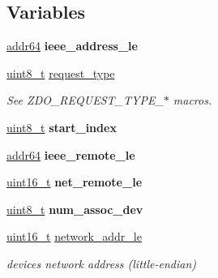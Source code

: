 \subsection*{Variables}
\begin{DoxyCompactItemize}
\item 
\mbox{\label{group__zdo_gaaa2474cd4ba581b23bc91a868c7e2714}} 
\hyperlink{unionaddr64}{addr64} {\bfseries ieee\+\_\+address\+\_\+le}
\item 
\mbox{\label{group__zdo_gacccc7895ee6181a7b3a1e15712402b55}} 
\hyperlink{group__hal__dos_gae1affc9ca37cfb624959c866a73f83c2}{uint8\+\_\+t} \hyperlink{group__zdo_gacccc7895ee6181a7b3a1e15712402b55}{request\+\_\+type}
\begin{DoxyCompactList}\small\item\em See Z\+D\+O\+\_\+\+R\+E\+Q\+U\+E\+S\+T\+\_\+\+T\+Y\+P\+E\+\_\+$\ast$ macros. \end{DoxyCompactList}\item 
\mbox{\label{group__zdo_ga00d5b2926389442973ad976082766309}} 
\hyperlink{group__hal__dos_gae1affc9ca37cfb624959c866a73f83c2}{uint8\+\_\+t} {\bfseries start\+\_\+index}
\item 
\mbox{\label{group__zdo_ga78a3358cbe5c23b718fba39bf101c593}} 
\hyperlink{unionaddr64}{addr64} {\bfseries ieee\+\_\+remote\+\_\+le}
\item 
\mbox{\label{group__zdo_ga536ff74dbcaa4380305de1658b13c206}} 
\hyperlink{group__hal__dos_ga5a8b2dc9e45a9ee81a94ef304fb62505}{uint16\+\_\+t} {\bfseries net\+\_\+remote\+\_\+le}
\item 
\mbox{\label{group__zdo_gaadd537d3a956b5c9ac83d83e7eb28f1e}} 
\hyperlink{group__hal__dos_gae1affc9ca37cfb624959c866a73f83c2}{uint8\+\_\+t} {\bfseries num\+\_\+assoc\+\_\+dev}
\item 
\mbox{\label{group__zdo_gaa7b6adb5a5b6441e4f669337f4ef61e5}} 
\hyperlink{group__hal__dos_ga5a8b2dc9e45a9ee81a94ef304fb62505}{uint16\+\_\+t} \hyperlink{group__zdo_gaa7b6adb5a5b6441e4f669337f4ef61e5}{network\+\_\+addr\+\_\+le}
\begin{DoxyCompactList}\small\item\em device\textquotesingle{}s network address (little-\/endian) \end{DoxyCompactList}\item 

\end{DoxyCompactItemize}
